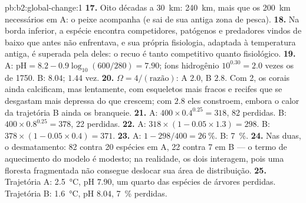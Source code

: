 \begin{solution}{pb:b2:global-change:1}
\textbf{17.} Oito décadas a \qty{30}{km}: \qty{240}{km}, mais que os
\qty{200}{km} necessários em A: o peixe acompanha (e sai de sua antiga
zona de pesca).
\textbf{18.} Na borda inferior, a espécie encontra competidores,
patógenos e predadores vindos de baixo que antes não enfrentava, e sua
própria fisiologia, adaptada à temperatura antiga, é superada pela deles:
o recuo é tanto competitivo quanto fisiológico.
\textbf{19.} A: $\mathrm{pH} = 8.2 - 0.9\log_{10}(600/280) = 7.90$;
íons hidrogênio $10^{0.30} = 2.0$ vezes os de 1750. B: $8.04$; $1.44$
vez.
\textbf{20.} $\Omega = 4/(\text{razão})$: A $2.0$, B $2.8$. Com 2, os
corais ainda calcificam, mas lentamente, com esqueletos mais fracos e
recifes que se desgastam mais depressa do que crescem; com $2.8$ eles
constroem, embora o calor da trajetória B ainda os branqueie.
\textbf{21.} A: $400\times 0.4^{0.25} = 318$, 82 perdidas. B:
$400\times 0.8^{0.25} = 378$, 22 perdidas.
\textbf{22.} A: $318\times(1 - 0.05\times 1.3) = 298$. B:
$378\times(1 - 0.05\times 0.4) = 371$.
\textbf{23.} A: $1 - 298/400 = \qty{26}{\%}$. B: \qty{7}{\%}.
\textbf{24.} Nas duas, o desmatamento: 82 contra 20 espécies em A, 22
contra 7 em B --- o termo de aquecimento do modelo é modesto; na
realidade, os dois interagem, pois uma floresta fragmentada não consegue
deslocar sua área de distribuição.
\textbf{25.} Trajetória A: \qty{2.5}{\celsius}, pH $7.90$, um quarto das
espécies de árvores perdidas. Trajetória B: \qty{1.6}{\celsius}, pH
$8.04$, \qty{7}{\%} perdidas.
\end{solution}
